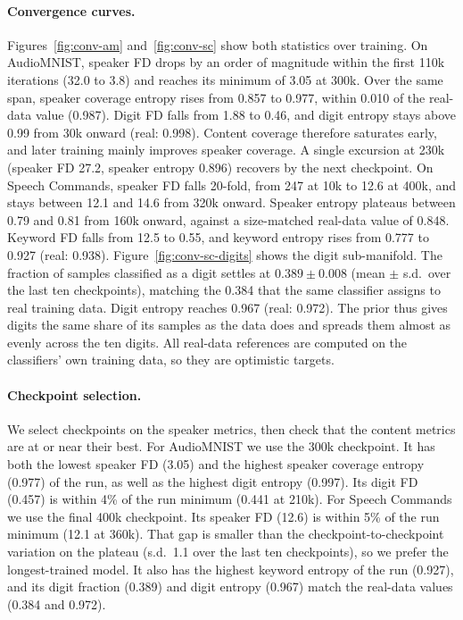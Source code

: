 \paragraph{Convergence curves.}
Figures~\ref{fig:conv-am} and~\ref{fig:conv-sc} show both statistics over training.
On AudioMNIST, speaker FD drops by an order of magnitude within the first 110k
iterations (32.0 to 3.8) and reaches its minimum of 3.05 at 300k. Over the same span,
speaker coverage entropy rises from 0.857 to 0.977, within 0.010 of the real-data
value (0.987). Digit FD falls from 1.88 to 0.46, and digit entropy stays above 0.99
from 30k onward (real: 0.998). Content coverage therefore saturates early, and later
training mainly improves speaker coverage. A single excursion at 230k (speaker FD
27.2, speaker entropy 0.896) recovers by the next checkpoint. On Speech Commands,
speaker FD falls 20-fold, from 247 at 10k to 12.6 at 400k, and stays between 12.1
and 14.6 from 320k onward. Speaker entropy plateaus between 0.79 and 0.81 from 160k
onward, against a size-matched real-data value of 0.848. Keyword FD falls from 12.5
to 0.55, and keyword entropy rises from 0.777 to 0.927 (real: 0.938).
Figure~\ref{fig:conv-sc-digits} shows the digit sub-manifold. The fraction of samples
classified as a digit settles at $0.389 \pm 0.008$ (mean $\pm$ s.d.\ over the last
ten checkpoints), matching the 0.384 that the same classifier assigns to real
training data. Digit entropy reaches 0.967 (real: 0.972). The prior thus gives digits
the same share of its samples as the data does and spreads them almost as evenly
across the ten digits. All real-data references are computed on the classifiers' own
training data, so they are optimistic targets.

\paragraph{Checkpoint selection.}
We select checkpoints on the speaker metrics, then check that the content metrics are
at or near their best. For AudioMNIST we use the 300k checkpoint. It has both the
lowest speaker FD (3.05) and the highest speaker coverage entropy (0.977) of the run,
as well as the highest digit entropy (0.997). Its digit FD (0.457) is within 4\% of
the run minimum (0.441 at 210k). For Speech Commands we use the final 400k
checkpoint. Its speaker FD (12.6) is within 5\% of the run minimum (12.1 at 360k).
That gap is smaller than the checkpoint-to-checkpoint variation on the plateau
(s.d.\ 1.1 over the last ten checkpoints), so we prefer the longest-trained model.
It also has the highest keyword entropy of the run (0.927), and its digit fraction
(0.389) and digit entropy (0.967) match the real-data values (0.384 and 0.972).

